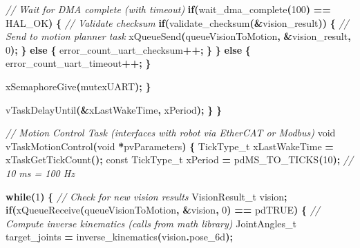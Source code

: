 \documentclass[
]{article}
\newenvironment{Shaded}{\begin{snugshade}}{\end{snugshade}}
\newcommand{\CommentTok}[1]{\textcolor[rgb]{0.56,0.35,0.01}{\textit{#1}}}
\newcommand{\ControlFlowTok}[1]{\textcolor[rgb]{0.13,0.29,0.53}{\textbf{#1}}}
\newcommand{\DataTypeTok}[1]{\textcolor[rgb]{0.13,0.29,0.53}{#1}}
\newcommand{\DecValTok}[1]{\textcolor[rgb]{0.00,0.00,0.81}{#1}}
\newcommand{\NormalTok}[1]{#1}
\newcommand{\OperatorTok}[1]{\textcolor[rgb]{0.81,0.36,0.00}{\textbf{#1}}}
\begin{document}
\begin{Shaded}
\begin{Highlighting}[]
            \CommentTok{// Wait for DMA complete (with timeout)}
            \ControlFlowTok{if}\OperatorTok{(}\NormalTok{wait\_dma\_complete}\OperatorTok{(}\DecValTok{100}\OperatorTok{)} \OperatorTok{==}\NormalTok{ HAL\_OK}\OperatorTok{)} \OperatorTok{\{}
                \CommentTok{// Validate checksum}
                \ControlFlowTok{if}\OperatorTok{(}\NormalTok{validate\_checksum}\OperatorTok{(\&}\NormalTok{vision\_result}\OperatorTok{))} \OperatorTok{\{}
                    \CommentTok{// Send to motion planner task}
\NormalTok{                    xQueueSend}\OperatorTok{(}\NormalTok{queueVisionToMotion}\OperatorTok{,} \OperatorTok{\&}\NormalTok{vision\_result}\OperatorTok{,} \DecValTok{0}\OperatorTok{);}
                \OperatorTok{\}} \ControlFlowTok{else} \OperatorTok{\{}
\NormalTok{                    error\_count\_uart\_checksum}\OperatorTok{++;}
                \OperatorTok{\}}
            \OperatorTok{\}} \ControlFlowTok{else} \OperatorTok{\{}
\NormalTok{                error\_count\_uart\_timeout}\OperatorTok{++;}
            \OperatorTok{\}}

\NormalTok{            xSemaphoreGive}\OperatorTok{(}\NormalTok{mutexUART}\OperatorTok{);}
        \OperatorTok{\}}

\NormalTok{        vTaskDelayUntil}\OperatorTok{(\&}\NormalTok{xLastWakeTime}\OperatorTok{,}\NormalTok{ xPeriod}\OperatorTok{);}
    \OperatorTok{\}}
\OperatorTok{\}}

\CommentTok{// Motion Control Task (interfaces with robot via EtherCAT or Modbus)}
\DataTypeTok{void}\NormalTok{ vTaskMotionControl}\OperatorTok{(}\DataTypeTok{void} \OperatorTok{*}\NormalTok{pvParameters}\OperatorTok{)} \OperatorTok{\{}
\NormalTok{    TickType\_t xLastWakeTime }\OperatorTok{=}\NormalTok{ xTaskGetTickCount}\OperatorTok{();}
    \DataTypeTok{const}\NormalTok{ TickType\_t xPeriod }\OperatorTok{=}\NormalTok{ pdMS\_TO\_TICKS}\OperatorTok{(}\DecValTok{10}\OperatorTok{);}  \CommentTok{// 10 ms = 100 Hz}

    \ControlFlowTok{while}\OperatorTok{(}\DecValTok{1}\OperatorTok{)} \OperatorTok{\{}
        \CommentTok{// Check for new vision results}
\NormalTok{        VisionResult\_t vision}\OperatorTok{;}
        \ControlFlowTok{if}\OperatorTok{(}\NormalTok{xQueueReceive}\OperatorTok{(}\NormalTok{queueVisionToMotion}\OperatorTok{,} \OperatorTok{\&}\NormalTok{vision}\OperatorTok{,} \DecValTok{0}\OperatorTok{)} \OperatorTok{==}\NormalTok{ pdTRUE}\OperatorTok{)} \OperatorTok{\{}
            \CommentTok{// Compute inverse kinematics (calls from math library)}
\NormalTok{            JointAngles\_t target\_joints }\OperatorTok{=}\NormalTok{ inverse\_kinematics}\OperatorTok{(}\NormalTok{vision}\OperatorTok{.}\NormalTok{pose\_6d}\OperatorTok{);}


\end{Highlighting}
\end{Shaded}
\end{document}
